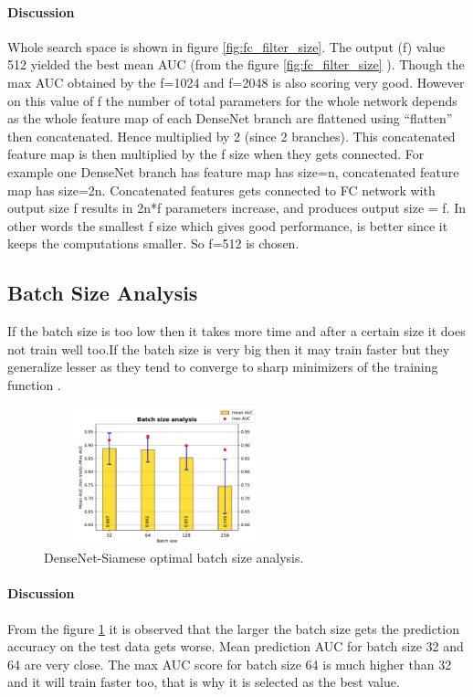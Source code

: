 \paragraph{Discussion\\}
Whole search space is shown in figure \ref{fig:fc_filter_size}. The output (f) value 512 yielded the best mean AUC (from the figure \ref{fig:fc_filter_size} ). Though the max AUC obtained by the f=1024 and f=2048 is also scoring very good.
However on this value of f the number of total parameters for the whole network depends as the whole feature map of each DenseNet branch are flattened using “flatten” then concatenated.
Hence multiplied by 2 (since 2 branches). This concatenated feature map is then multiplied by the f size when they gets connected.
For example one DenseNet branch has feature map has size=n, concatenated feature map has size=2n. Concatenated features gets connected to FC network with output size f results in 2n*f parameters increase, and produces output size = f.
In other words the smallest f size which gives good performance, is better since it keeps the computations smaller. So f=512 is chosen.

\subsection{Batch Size Analysis}
If the batch size is too low then it takes more time and after a certain size it does not train well too.If the batch size is very big then it may train faster but they generalize lesser as they tend to converge to 
sharp minimizers of the training function \cite{keskar2016large}.

\begin{figure}[ht]
\centering
\includegraphics[width=7cm,height=4cm]{images/densenet/siamese/densenet_siamese_batchsize}
\caption{DenseNet-Siamese optimal batch size analysis.}
\label{fig:batch_size}
\end{figure}

\paragraph{Discussion\\}
From the figure \ref{fig:batch_size} it is observed that the larger the batch size gets the prediction accuracy on the test data gets worse. Mean prediction AUC for batch size 32 and 64 are very close.
The max AUC score for batch size 64 is much higher than 32 and it will train faster too, that is why it is selected as the best value. 

